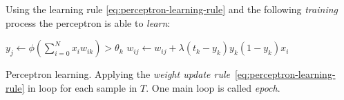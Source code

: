 Using the learning rule \ref{eq:perceptron-learning-rule} and the following \emph{training} process the perceptron is able to \emph{learn}: 
\begin{algorithm}[H]
  \begin{algorithmic}
        \State $y_j \gets \phi(\sum_{i=0}^N x_iw_{ik}) > \theta_k$
          \State $w_{ij} \gets w_{ij} + \lambda (t_k - y_k)y_k(1 - y_k)x_i$
        \EndFor
      \EndFor
    \EndFor
  \end{algorithmic}
  \caption{Perceptron learning. Applying the \emph{weight update rule}~\ref{eq:perceptron-learning-rule} in loop for each sample in $T$. One main loop is called \emph{epoch}.}  
  \label{alg:perceptron-learning}
\end{algorithm} 

